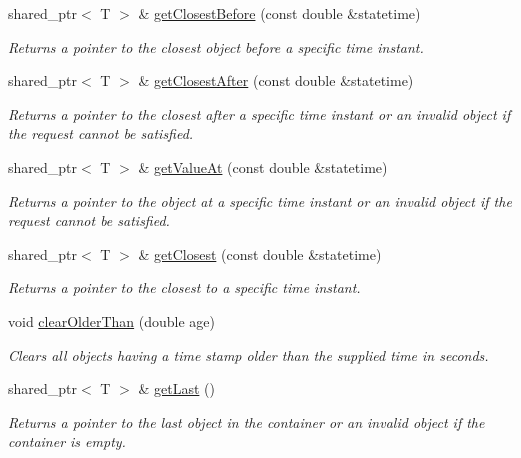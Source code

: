 \begin{DoxyCompactItemize}
shared\-\_\-ptr$<$ T $>$ \& \hyperlink{classmsf__core_1_1SortedContainer_ad027825ff0a1360acbe6b9c60f708cd9}{get\-Closest\-Before} (const double \&statetime)
\begin{DoxyCompactList}\small\item\em Returns a pointer to the closest object before a specific time instant. \end{DoxyCompactList}\item 
shared\-\_\-ptr$<$ T $>$ \& \hyperlink{classmsf__core_1_1SortedContainer_a1bf7a97e06b2dd5bc2b6588dcb6799b8}{get\-Closest\-After} (const double \&statetime)
\begin{DoxyCompactList}\small\item\em Returns a pointer to the closest after a specific time instant or an invalid object if the request cannot be satisfied. \end{DoxyCompactList}\item 
shared\-\_\-ptr$<$ T $>$ \& \hyperlink{classmsf__core_1_1SortedContainer_aa0de5fa4d79a266a36556b67252a7d34}{get\-Value\-At} (const double \&statetime)
\begin{DoxyCompactList}\small\item\em Returns a pointer to the object at a specific time instant or an invalid object if the request cannot be satisfied. \end{DoxyCompactList}\item 
shared\-\_\-ptr$<$ T $>$ \& \hyperlink{classmsf__core_1_1SortedContainer_ab262e5e5904b047df44110c1d05babdc}{get\-Closest} (const double \&statetime)
\begin{DoxyCompactList}\small\item\em Returns a pointer to the closest to a specific time instant. \end{DoxyCompactList}\item 
void \hyperlink{classmsf__core_1_1SortedContainer_aa2e690d22ea362eeb281ce30a96751d5}{clear\-Older\-Than} (double age)
\begin{DoxyCompactList}\small\item\em Clears all objects having a time stamp older than the supplied time in seconds. \end{DoxyCompactList}\item 
shared\-\_\-ptr$<$ T $>$ \& \hyperlink{classmsf__core_1_1SortedContainer_ada83f9baa4b17b5816975b1e67354ff1}{get\-Last} ()
\begin{DoxyCompactList}\small\item\em Returns a pointer to the last object in the container or an invalid object if the container is empty. \end{DoxyCompactList}\item 

\end{DoxyCompactItemize}
